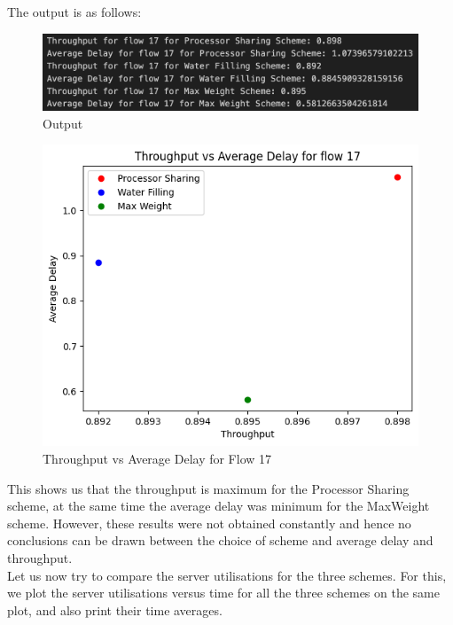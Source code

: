 \documentclass[11pt, a4paper]{article}
\begin{document}
The output is as follows:
\begin{figure}[H]
     \centering
     \includegraphics[scale=0.2]{fig_9.png}
     \caption{Output}
\end{figure}


\begin{figure}[H]
     \centering
     \includegraphics[scale=0.5]{fig_11.png}
     \caption{Throughput vs Average Delay for Flow 17}
\end{figure}

This shows us that the throughput is maximum for the Processor Sharing scheme, at the same time the average delay was minimum for the MaxWeight scheme. However, these results were not obtained constantly and hence no conclusions can be drawn between the choice of scheme and average delay and throughput.\\

Let us now try to compare the server utilisations for the three schemes.
For this, we plot the server utilisations versus time for all the three schemes on the same plot, and also print their time averages.
\end{document}

